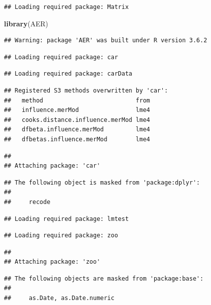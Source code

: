 \documentclass[]{article}
\newenvironment{Shaded}{\begin{snugshade}}{\end{snugshade}}
\newcommand{\KeywordTok}[1]{\textcolor[rgb]{0.13,0.29,0.53}{\textbf{#1}}}
\newcommand{\NormalTok}[1]{#1}
\begin{document}
\begin{verbatim}
## Loading required package: Matrix
\end{verbatim}

\begin{Shaded}
\begin{Highlighting}[]
\KeywordTok{library}\NormalTok{(AER)}
\end{Highlighting}
\end{Shaded}

\begin{verbatim}
## Warning: package 'AER' was built under R version 3.6.2
\end{verbatim}

\begin{verbatim}
## Loading required package: car
\end{verbatim}

\begin{verbatim}
## Loading required package: carData
\end{verbatim}

\begin{verbatim}
## Registered S3 methods overwritten by 'car':
##   method                          from
##   influence.merMod                lme4
##   cooks.distance.influence.merMod lme4
##   dfbeta.influence.merMod         lme4
##   dfbetas.influence.merMod        lme4
\end{verbatim}

\begin{verbatim}
## 
## Attaching package: 'car'
\end{verbatim}

\begin{verbatim}
## The following object is masked from 'package:dplyr':
## 
##     recode
\end{verbatim}

\begin{verbatim}
## Loading required package: lmtest
\end{verbatim}

\begin{verbatim}
## Loading required package: zoo
\end{verbatim}

\begin{verbatim}
## 
## Attaching package: 'zoo'
\end{verbatim}

\begin{verbatim}
## The following objects are masked from 'package:base':
## 
##     as.Date, as.Date.numeric
\end{verbatim}
\end{document}
